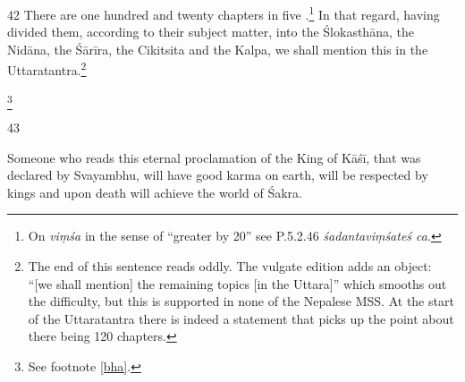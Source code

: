\begin{translation}

\item [42] There are one hundred and twenty chapters in five
.\footnote{On \emph{viṃśa} in the sense of “greater by 20”
see P.5.2.46 \emph{śadantaviṃśateś ca}.}  In that regard, having divided them,
according to their subject matter, into the Ślokasthāna, the Nidāna, the Śārīra,
the Cikitsita and the Kalpa, we shall mention this in the
Uttaratantra.\footnote{The end of this sentence reads oddly.  The vulgate edition
adds an object: “[we shall mention] the remaining topics [in the Uttara]” which
smooths out the difficulty, but this is supported in none of the Nepalese MSS.  At
the start of the Uttaratantra \citep[1.3--4ab]{susr-trikamji3} there is indeed a
statement that picks up the point about there being 120 chapters.}

\footnote{See footnote \ref{bha}.}

\item[43]    
\begin{sloka}
    Someone who reads this eternal proclamation of the King of
    Kāśī, that was declared by Svayambhu, will have good karma on earth, will
    be respected by kings and upon death will achieve the world of Śakra.
\end{sloka}

\end{translation}    



